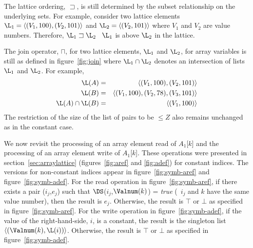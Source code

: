 The lattice ordering, $\sqsupset$,
is still determined by the subset relationship on the underlying sets. For example, consider two lattice elements $\L_1 =
\langle(V_1,100), (V_2,101)\rangle$ and $\L_2 =
\langle(V_2,101)\rangle$ where $V_1$ and $V_2$ are value numbers.  
Therefore, $\L_1 \sqsupset \L_2$ \ie\ $\L_1$ is above $\L_2$ in the
lattice.

The join operator, $\sqcap$, for two lattice elements, $\L_1$ and
$\L_2$, for array variables is still as defined in
figure~\ref{fig:join} where $\L_1 \cap \L_2$ denotes an intersection
of lists $\L_1$ and $\L_2$.  For example,
\begin{eqnarray*}
\L(A) & =  &\langle(V_1,100), (V_2,101)\rangle \\
\L(B) & =  &\langle(V_1,100), (V_2,78), (V_3,101)\rangle \\
\L(A) \cap \L(B) & =  & \langle (V_1,100) \rangle
\end{eqnarray*}
The restriction of the size of the list of pairs  to be $\leq Z$ 
also remains unchanged as in the constant case.

We now revisit the processing of an array element read of $A_1$[$k$] and
the processing of an array element write of $A_1$[$k$]. These
operations were presented in section~\ref{sec:arraylattice}
(figures~\ref{fig:aref} and \ref{fig:adef})
for constant indices. The versions for
non-constant indices appear in figure~\ref{fig:symb-aref} and
figure~\ref{fig:symb-adef}.
For the read operation in figure~\ref{fig:symb-aref}, if there exists a pair ($i_j$,$e_j$) such that
$\DS$($i_j$,$\Valnum(k)$) = {\it true} (\ie\ $i_j$ and $k$ have the
same value number), then the
result is $e_j$.  Otherwise, the result is $\top$ or $\bot$ as specified
in figure~\ref{fig:symb-aref}.
For the write operation in figure~\ref{fig:symb-adef}, if the value of the right-hand-side, $i$, is a constant, the result is the singleton list
$\langle(\Valnum(k),\L(i))\rangle$.  Otherwise, the result is $\top$ or $\bot$ as specified
in figure~\ref{fig:symb-adef}.

